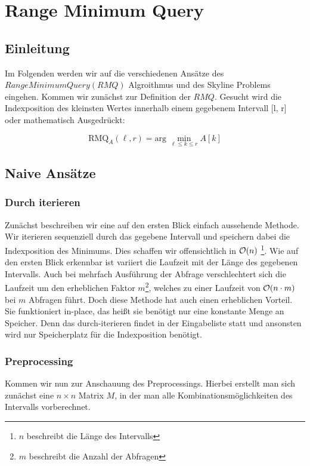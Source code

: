 \chapter[RMQ]{Range Minimum Query}

\section{Einleitung}

Im Folgenden werden wir auf die verschiedenen Ansätze des $ Range Minimum Query (RMQ) $ Algroithmus und des Skyline Problems eingehen. Kommen wir zunächst zur Definition der $ RMQ $. Gesucht wird die Indexposition des kleinsten Wertes innerhalb einem gegebenem Intervall [l, r] oder mathematisch Ausgedrückt:

\[\text{RMQ}_{A}(\ell,r) = \text{arg} \ \min_{\ell \leq k \leq r } A[k] \]

\section{Naive Ansätze}
\subsection{Durch iterieren}

Zunächst beschreiben wir eine auf den ersten Blick einfach aussehende Methode. Wir iterieren sequenziell durch das gegebene Intervall und speichern dabei die Indexposition des Minimums. Dies schaffen wir offensichtlich in $\mathcal{O}(n)$ \footnote{\label{foot:1} $n$ beschreibt die Länge des Intervalls}. Wie auf den ersten Blick erkennbar ist variiert die Laufzeit mit der Länge des gegebenen Intervalls. Auch bei mehrfach Ausführung der Abfrage verschlechtert sich die Laufzeit um den erheblichen Faktor $m$\footnote{\label{foot:2} $m$ beschreibt die Anzahl der Abfragen}, welches zu einer Laufzeit von $\mathcal{O}(n\cdot m)$ bei $m$ Abfragen führt. Doch diese Methode hat auch einen erheblichen Vorteil. Sie funktioniert in-place, das heißt sie benötigt nur eine konstante Menge an Speicher. Denn das durch-iterieren findet in der Eingabeliste statt und ansonsten wird nur Speicherplatz für die Indexposition benötigt.

\subsection{Preprocessing}

Kommen wir nun zur Anschauung des Preprocessings. Hierbei erstellt man sich zunächst eine $n\times n$ Matrix $M$, in der man alle Kombinationsmöglichkeiten des Intervalls vorberechnet.

